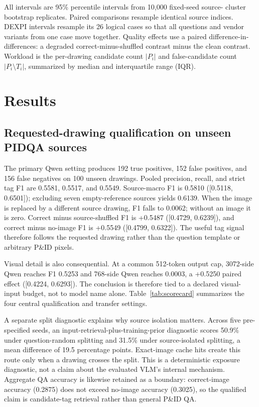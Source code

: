 \documentclass[11pt]{article}
\begin{document}
All intervals are 95\% percentile intervals from 10,000 fixed-seed source-
cluster bootstrap replicates. Paired comparisons resample identical source
indices. DEXPI intervals resample its 26 logical cases so that all questions
and vendor variants from one case move together. Quality effects use a paired
difference-in-differences: a degraded correct-minus-shuffled contrast minus
the clean contrast. Workload is the per-drawing candidate count $|P_i|$ and
false-candidate count $|P_i\setminus T_i|$, summarized by median and
interquartile range (IQR).

\section{Results}

\subsection{Requested-drawing qualification on unseen PIDQA sources}

The primary Qwen setting produces 192 true positives, 152 false positives,
and 156 false negatives on 100 unseen drawings. Pooled precision, recall, and
strict tag F1 are 0.5581, 0.5517, and 0.5549. Source-macro F1 is 0.5810
([0.5118, 0.6501]); excluding seven empty-reference sources yields 0.6139.
When the image is replaced by a different source drawing, F1 falls to 0.0062;
without an image it is zero. Correct minus source-shuffled F1 is +0.5487
([0.4729, 0.6239]), and correct minus no-image F1 is +0.5549
([0.4799, 0.6322]). The useful tag signal therefore follows the requested
drawing rather than the question template or arbitrary P\&ID pixels.

Visual detail is also consequential. At a common 512-token output cap,
3072-side Qwen reaches F1 0.5253 and 768-side Qwen reaches 0.0003, a +0.5250
paired effect ([0.4224, 0.6293]). The conclusion is therefore tied to a
declared visual-input budget, not to model name alone. Table~\ref{tab:scorecard}
summarizes the four central qualification and transfer settings.



A separate split diagnostic explains why source isolation matters. Across five
pre-specified seeds, an input-retrieval-plus-training-prior diagnostic scores
50.9\% under question-random splitting and 31.5\% under source-isolated
splitting, a mean difference of 19.5 percentage points. Exact-image cache hits
create this route only when a drawing crosses the split. This is a
deterministic exposure diagnostic, not a claim about the evaluated VLM's
internal mechanism. Aggregate QA accuracy is likewise retained as a boundary:
correct-image accuracy (0.2875) does not exceed no-image accuracy (0.3025), so
the qualified claim is candidate-tag retrieval rather than general P\&ID QA.
\end{document}
